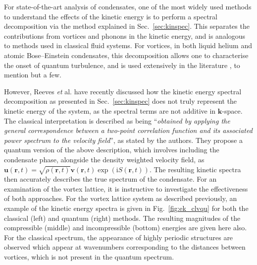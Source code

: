 For state-of-the-art analysis of condensates, one of the most widely used methods to understand the effects of the kinetic energy is to perform a spectral decomposition via the method explained in Sec.~\ref{sec:kinspec}. This separates the contributions from vortices and phonons in the kinetic energy, and is analogous to methods used in classical fluid systems. For vortices, in both liquid helium and atomic Bose--Einstein condensates, this decomposition allows one to characterise the onset of quantum turbulence, and is used extensively in the literature \cite{VTX:Kobayashi_prl_2005,VTX:Tsubota_jphys_2009,CT:Bradley_prx_2012,VTX:White_jphys_2014,VTX:Skaugen_pre_2016}, to mention but a few. %

However, Reeves {\it et} al. \cite{VTX:Reeves_pra_2014} have recently discussed how the kinetic energy spectral decomposition as presented in Sec.~\ref{sec:kinspec} does not truly represent the kinetic energy of the system, as the spectral terms are not additive in $\mathbf{k}$-space. The classical interpretation is described as being ``\textit{obtained by applying the general correspondence between a two-point correlation function and its associated
power spectrum to the velocity field}'', as stated by the authors. They propose a quantum version of the above description, which involves including the condensate phase, alongside the density weighted velocity field, as $\mathbf{u}(\mathbf{r},t) = \sqrt{\rho(\mathbf{r},t)}\mathbf{v}(\mathbf{r},t)\exp\left(\textrm{i}S(\mathbf{r},t)\right)$. The resulting kinetic spectra then accurately describes the true spectrum of the condensate. For an examination of the vortex lattice, it is instructive to investigate the effectiveness of both approaches. For the vortex lattice system as described previously, an example of the kinetic energy spectra is given in Fig.~\ref{fig:ek_clvqu} for both the classical (left) and quantum (right) methods. The resulting magnitudes of the compressible (middle) and incompressible (bottom) energies are given here also. For the classical spectrum, the appearance of highly periodic structures are observed which appear at wavenumbers corresponding to the distances between vortices, which is not present in the quantum spectrum.

